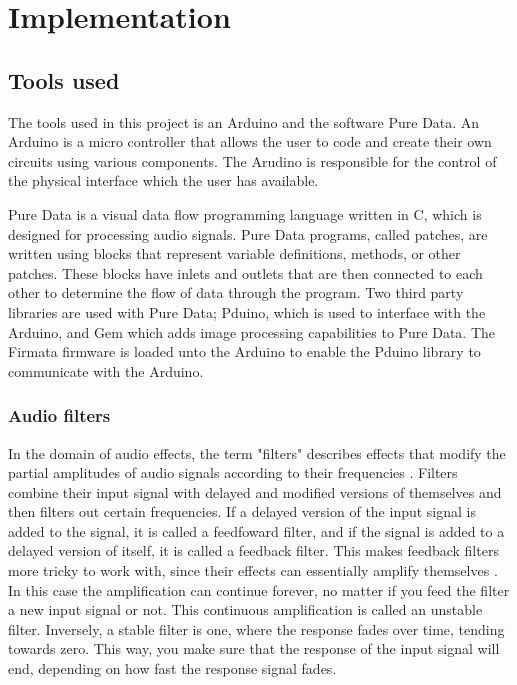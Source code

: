 \chapter{Implementation}\label{ch:implementation}

\section{Tools used}\label{sec:toolsused}
The tools used in this project is an Arduino and the software Pure Data. An Arduino is a micro controller that allows the user to code and create their own circuits using various components. The Arudino is responsible for the control of the physical interface which the user has available.

Pure Data is a visual data flow programming language \cite{puredata} written in C, which is designed for processing audio signals. Pure Data programs, called patches, are written using blocks that represent variable definitions, methods, or other patches. These blocks have inlets and outlets that are then connected to each other to determine the flow of data through the program. Two third party libraries are used with Pure Data; Pduino, which is used to interface with the Arduino, and Gem which adds image processing capabilities to Pure Data. The Firmata firmware is loaded unto the Arduino to enable the Pduino library to communicate with the Arduino.

\subsection{Audio filters}
In the domain of audio effects, the term "filters" describes effects that modify the partial amplitudes of audio signals according to their frequencies \cite{zolzer2011dafx}. Filters combine their input signal with delayed and modified versions of themselves and then filters out certain frequencies. If a delayed version of the input signal is added to the signal, it is called a feedfoward filter, and if the signal is added to a delayed version of itself, it is called a feedback filter. This makes feedback filters more tricky to work with, since their effects can essentially amplify themselves \cite{steiglitz1997digital}. In this case the amplification can continue forever, no matter if you feed the filter a new input signal or not. This continuous amplification is called an unstable filter. Inversely, a stable filter is one, where the response fades over time, tending towards zero. This way, you make sure that the response of the input signal will end, depending on how fast the response signal fades.

